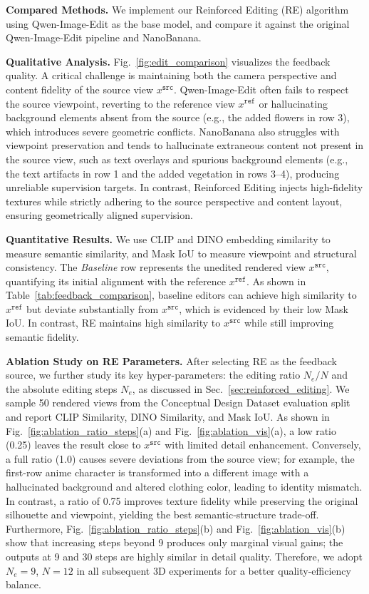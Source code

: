 \documentclass[runningheads]{llncs}
\begin{document}
\textbf{Compared Methods.}
We implement our Reinforced Editing (RE) algorithm using Qwen-Image-Edit as the base model, and compare it against the original Qwen-Image-Edit pipeline and NanoBanana.



\textbf{Qualitative Analysis.}
Fig.~\ref{fig:edit_comparison} visualizes the feedback quality. A critical challenge is maintaining both the camera perspective and content fidelity of the source view $x^{\texttt{src}}$.
Qwen-Image-Edit often fails to respect the source viewpoint, reverting to the reference view $x^{\texttt{ref}}$ or hallucinating background elements absent from the source (e.g., the added flowers in row 3), which introduces severe geometric conflicts.
NanoBanana also struggles with viewpoint preservation and tends to hallucinate extraneous content not present in the source view, such as text overlays and spurious background elements (e.g., the text artifacts in row 1 and the added vegetation in rows 3--4), producing unreliable supervision targets.
In contrast, Reinforced Editing injects high-fidelity textures while strictly adhering to the source perspective and content layout, ensuring geometrically aligned supervision.

\textbf{Quantitative Results.}
We use CLIP and DINO embedding similarity to measure semantic similarity, and Mask IoU to measure viewpoint and structural consistency.
The \textit{Baseline} row represents the unedited rendered view $x^{\texttt{src}}$, quantifying its initial alignment with the reference $x^{\texttt{ref}}$.
As shown in Table~\ref{tab:feedback_comparison}, baseline editors can achieve high similarity to $x^{\texttt{ref}}$ but deviate substantially from $x^{\texttt{src}}$, which is evidenced by their low Mask IoU.
In contrast, RE maintains high similarity to $x^{\texttt{src}}$ while still improving semantic fidelity.



\textbf{Ablation Study on RE Parameters.}
After selecting RE as the feedback source, we further study its key hyper-parameters: the editing ratio $N_e/N$ and the absolute editing steps $N_e$, as discussed in Sec.~\ref{sec:reinforced_editing}.
We sample 50 rendered views from the Conceptual Design Dataset evaluation split and report CLIP Similarity, DINO Similarity, and Mask IoU.
As shown in Fig.~\ref{fig:ablation_ratio_steps}(a) and Fig.~\ref{fig:ablation_vis}(a), a low ratio (0.25) leaves the result close to $x^{\texttt{src}}$ with limited detail enhancement. Conversely, a full ratio (1.0) causes severe deviations from the source view; for example, the first-row anime character is transformed into a different image with a hallucinated background and altered clothing color, leading to identity mismatch. In contrast, a ratio of 0.75 improves texture fidelity while preserving the original silhouette and viewpoint, yielding the best semantic-structure trade-off.
Furthermore, Fig.~\ref{fig:ablation_ratio_steps}(b) and Fig.~\ref{fig:ablation_vis}(b) show that increasing steps beyond 9 produces only marginal visual gains; the outputs at 9 and 30 steps are highly similar in detail quality.
Therefore, we adopt $N_e=9$, $N=12$ in all subsequent 3D experiments for a better quality-efficiency balance.
\end{document}
